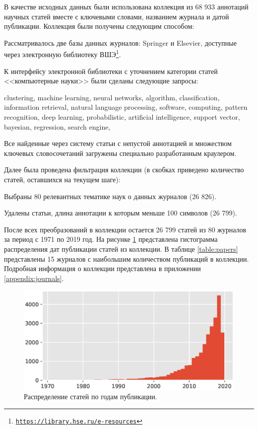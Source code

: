 \documentclass[12pt]{article}
\newenvironment{enumerate*}%
{\begin{enumerate}%
		\setlength{\itemsep}{0pt}%
		\setlength{\parskip}{0pt}}%
	{\end{enumerate}}
\newcommand{\hrefl}[1] {\texttt{\href{#1}{#1}}}
\begin{document}
В качестве исходных данных были использована коллекция из 68 933 аннотаций научных статей вместе с ключевыми словами, названием журнала и датой публикации. Коллекция были получены следующим способом:
\begin{enumerate*}
	\item Рассматривалось две базы данных журналов: Springer и Elsevier, доступные через электронную библиотеку ВШЭ\footnote{\hrefl{https://library.hse.ru/e-resources}}.
	\item К интерфейсу электронной библиотеки с уточнением категории статей <<компьютерные науки>> были сделаны следующие запросы:
	
	\textsf{clustering, machine learning, neural networks, algorithm, classification, information retrieval, natural language processing, software, computing, pattern recognition, deep learning, probabilistic, artificial intelligence, support vector, bayesian, regression, search engine}, 
	
	\item Все найденные через систему статьи с непустой аннотацией и множеством ключевых словосочетаний загружены специально разработанным краулером.
\end{enumerate*}
Далее была проведена фильтрация коллекции (в скобках приведено количество статей, оставшихся на текущем шаге):
\begin{enumerate*}
	\item Выбраны 80 релевантных тематике наук о данных журналов (26 826).
	\item Удалены статьи, длина аннотации к которым меньше 100 символов (26 799).
\end{enumerate*}
После всех преобразований в коллекции остается 26 799 статей из 80 журналов за период с 1971 по 2019 год. На рисунке \ref{fig:papersdatehist} представлена гистограмма распределения дат публикации статей из коллекции. В таблице \ref{table:papers} представлены 15 журналов с наибольшим количеством публикаций в коллекции. Подробная информация о коллекции представлена в приложении \ref{appendix:journals}.

\begin{figure}
	\centering
	\includegraphics[width=0.5\linewidth]{images/papers_date_hist}
	\caption{Распределение статей по годам публикации.}
	\label{fig:papersdatehist}
\end{figure}
\end{document}
